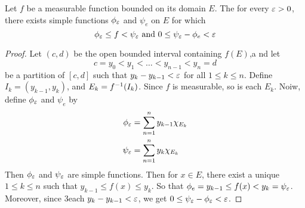 \begin{lemma}\label{3.2.2}
    Let $f$ be a measurable function bounded on its domain  $E$. The for every
    $\varepsilon>0$, there exists simple functions  $\phi_\varepsilon$ and  $\psi_e$ on  $E$ for
    which
    \begin{equation*}
        \phi_\varepsilon \leq f < \psi_\varepsilon \text{ and } 0 \leq \psi_\varepsilon-\phi_e<\varepsilon
    \end{equation*}
\end{lemma}
\begin{proof}
    Let $(c,d)$ be the open bounded interval containing $f(E)$,a nd let
    \begin{equation*}
        c=y_0<y_1<\dots<y_{n-1}<y_n=d
    \end{equation*}
    be a partition of $[c,d]$ such that $y_k-y_{k-1}<\varepsilon$ for all  $1 \leq k \leq
    n$. Define $I_k=(y_{k-1},y_k)$, and $E_k=f^{-1}(I_k)$. Since $f$ is
    measurable, so is each  $E_k$. Noiw, define  $\phi_\varepsilon$ and  $\psi_e$ by
    \begin{align*}
        \phi_\varepsilon     &=  \sum_{n=1}^n{y_{k-1}\chi_{E_k}} \\
        \psi_\varepsilon     &=  \sum_{n=1}^n{y_k\chi_{E_k}} \\
    \end{align*}
    Then $\phi_\varepsilon$ and  $\psi_\varepsilon$ are simple functions. Then for  $x \in E$,
    there exist a unique  $1 \leq k \leq n$ such that  $y_{k-1} \leq f(x) \leq
    y_k$. So that $\phi_e=y_{k-1} \leq f(x)<y_k=\psi_\varepsilon$. Moreover, since 3each
    $y_k-y_{k-1}<\varepsilon$, we get $0 \leq \psi_\varepsilon-\phi_\varepsilon<\varepsilon$.
\end{proof}

